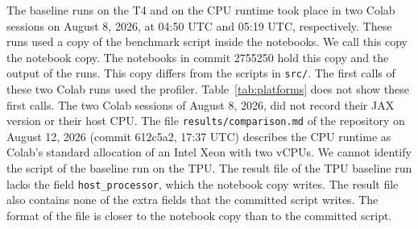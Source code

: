 The baseline runs on the T4 and on the CPU runtime took place in two Colab sessions on August 8, 2026, at 04:50 UTC and 05:19 UTC, respectively. %
These runs used a copy of the benchmark script inside the notebooks. We call this copy the notebook copy.
The notebooks in commit 2755250 hold this copy and the output of the runs. This copy differs from the scripts in \texttt{src/}. %
The first calls of these two Colab runs used the profiler. Table~\ref{tab:platforms} does not show these first calls.
The two Colab sessions of August 8, 2026, did not record their JAX version or their host CPU. %
The file \texttt{results/comparison.md} of the repository on August 12, 2026 (commit 612c5a2, 17:37 UTC) describes the CPU runtime as Colab's standard allocation of an Intel Xeon with two vCPUs. %
We cannot identify the script of the baseline run on the TPU.
The result file of the TPU baseline run lacks the field \texttt{host\_processor}, which the notebook copy writes. The result file also contains none of the extra fields that the committed script writes. %
The format of the file is closer to the notebook copy than to the committed script.

